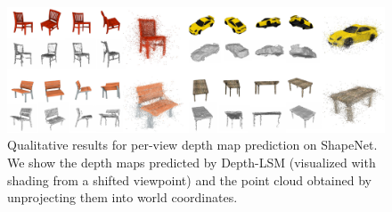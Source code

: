 \begin{figure}
\includegraphics[width=\linewidth]{figures/depth_results.pdf}
\caption{Qualitative results for per-view depth map prediction on ShapeNet. We show the depth maps predicted by Depth-LSM (visualized with shading from a shifted viewpoint) and the point cloud obtained by unprojecting them into world coordinates.}
\end{figure}